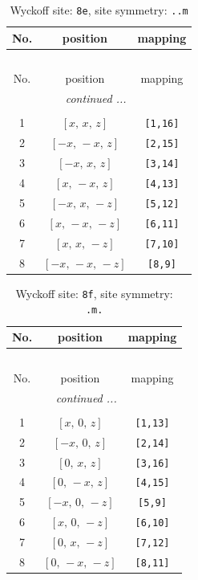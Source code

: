 \documentclass[fleqn,8pt]{jsarticle}
\begin{document}
\begin{longtable}{ccc}
\caption{Wyckoff site: {\tt 8e}, site symmetry: {\tt ..m}}
 \\
 \hline \hline
No. & position & mapping \\ \hline \endfirsthead

\multicolumn{2}{l}{\tablename\ \thetable{}} \\
 \hline \hline
No. & position & mapping \\ \hline \endhead

 \hline \hline
\multicolumn{2}{r}{\footnotesize\it continued ...} \\ \endfoot

 \hline \hline
\multicolumn{2}{r}{} \\ \endlastfoot

1 & $\left[ x,\, x,\, z \right]$ & {\tt [1,16]} \\ \hline
2 & $\left[ - x,\, - x,\, z \right]$ & {\tt [2,15]} \\ \hline
3 & $\left[ - x,\, x,\, z \right]$ & {\tt [3,14]} \\ \hline
4 & $\left[ x,\, - x,\, z \right]$ & {\tt [4,13]} \\ \hline
5 & $\left[ - x,\, x,\, - z \right]$ & {\tt [5,12]} \\ \hline
6 & $\left[ x,\, - x,\, - z \right]$ & {\tt [6,11]} \\ \hline
7 & $\left[ x,\, x,\, - z \right]$ & {\tt [7,10]} \\ \hline
8 & $\left[ - x,\, - x,\, - z \right]$ & {\tt [8,9]} \\
\end{longtable}
\renewcommand{\arraystretch}{1.2}
\begin{longtable}{ccc}
\caption{Wyckoff site: {\tt 8f}, site symmetry: {\tt .m.}}
 \\
 \hline \hline
No. & position & mapping \\ \hline \endfirsthead

\multicolumn{2}{l}{\tablename\ \thetable{}} \\
 \hline \hline
No. & position & mapping \\ \hline \endhead

 \hline \hline
\multicolumn{2}{r}{\footnotesize\it continued ...} \\ \endfoot

 \hline \hline
\multicolumn{2}{r}{} \\ \endlastfoot

1 & $\left[ x,\, 0,\, z \right]$ & {\tt [1,13]} \\ \hline
2 & $\left[ - x,\, 0,\, z \right]$ & {\tt [2,14]} \\ \hline
3 & $\left[ 0,\, x,\, z \right]$ & {\tt [3,16]} \\ \hline
4 & $\left[ 0,\, - x,\, z \right]$ & {\tt [4,15]} \\ \hline
5 & $\left[ - x,\, 0,\, - z \right]$ & {\tt [5,9]} \\ \hline
6 & $\left[ x,\, 0,\, - z \right]$ & {\tt [6,10]} \\ \hline
7 & $\left[ 0,\, x,\, - z \right]$ & {\tt [7,12]} \\ \hline
8 & $\left[ 0,\, - x,\, - z \right]$ & {\tt [8,11]} \\
\end{longtable}
\end{document}

